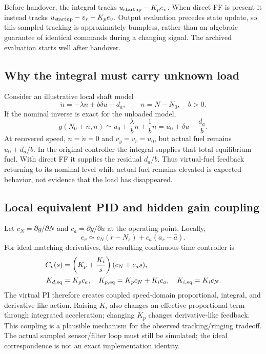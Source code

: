 Before handover, the integral tracks $u_{\rm startup}-K_pe_v$. When direct FF is present it instead tracks $u_{\rm startup}-v_r-K_pe_v$. Output evaluation precedes state update, so this sampled tracking is approximately bumpless, rather than an algebraic guarantee of identical commands during a changing signal. The archived evaluation starts well after handover.

\subsection{Why the integral must carry unknown load}
Consider an illustrative local shaft model
\begin{equation}
\dot n=-\lambda n+b\delta u-d_a,\qquad n=N-N_0,\quad b>0.
\label{eq:localplant}
\end{equation}
If the nominal inverse is exact for the unloaded model,
\begin{equation}
g(N_0+n,\dot n)\simeq u_0+\frac{\lambda}{b}n+\frac1b\dot n
=u_0+\delta u-\frac{d_a}{b}.
\end{equation}
At recovered speed, $n=\dot n=0$ and $v_y=v_r=u_0$, but actual fuel remains $u_0+d_a/b$. In the original controller the integral supplies that total equilibrium fuel. With direct FF it supplies the residual $d_a/b$. Thus virtual-fuel feedback returning to its nominal level while actual fuel remains elevated is expected behavior, not evidence that the load has disappeared.

\subsection{Local equivalent PID and hidden gain coupling}
Let $c_N=\partial g/\partial N$ and $c_a=\partial g/\partial a$ at the operating point. Locally,
\begin{equation}
e_v\simeq c_N(r-N_s)+c_a(a_r-\hat a).
\end{equation}
For ideal matching derivatives, the resulting continuous-time controller is
\begin{align}
C_v(s)&=\left(K_p+\frac{K_i}{s}\right)(c_N+c_as),\\
K_{d,\rm eq}&=K_pc_a,\quad
K_{p,\rm eq}=K_pc_N+K_ic_a,\quad
K_{i,\rm eq}=K_ic_N.
\label{eq:equivalent}
\end{align}
The virtual PI therefore creates coupled speed-domain proportional, integral, and derivative-like action. Raising $K_i$ also changes an effective proportional term through integrated acceleration; changing $K_p$ changes derivative-like feedback. This coupling is a plausible mechanism for the observed tracking/ringing tradeoff. The actual sampled sensor/filter loop must still be simulated; the ideal correspondence is not an exact implementation identity.

